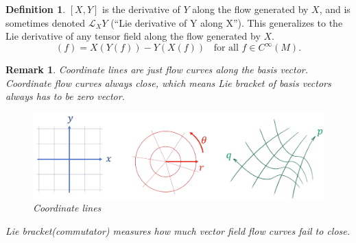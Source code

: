 \documentclass[a4paper]{article}
\theoremstyle{definition}
\newtheorem{definition}{Definition}
\theoremstyle{plain}
\newtheorem{remark}{Remark}
\begin{document}
\begin{definition}
$[X, Y]$ is the derivative of $Y$ along the flow generated by $X$, and is sometimes denoted $\mathcal {L}_XY$ (``Lie derivative of Y along X''). This generalizes to the Lie derivative of any tensor field along the flow generated by $X$.
\begin{equation*}
    [X,Y](f)=X(Y(f))-Y(X(f))\;\;{\text{  for all }}f\in C^{\infty }(M).
\end{equation*}
\end{definition}

\begin{remark}
Coordinate lines are just flow curves along the basis vector. Coordinate flow curves always close, which means Lie bracket of basis vectors always has to be zero vector.
\begin{figure}[H]
   \centering
   \includegraphics[scale=0.2]{figure/coordinatelines.png}
   \caption{Coordinate lines}
\end{figure}
Lie bracket(commutator) measures how much vector field flow curves fail to close.
\end{remark}
\end{document}
